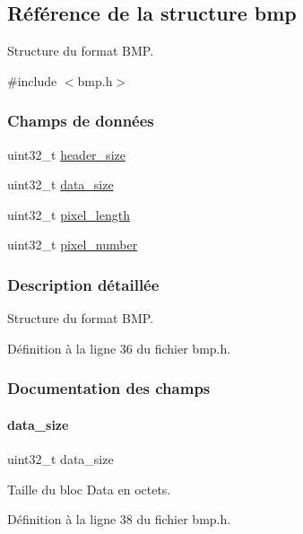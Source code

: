 \hypertarget{a00162}{}\subsection{Référence de la structure bmp}
\label{a00162}


Structure du format B\+MP.  




{\ttfamily \#include $<$bmp.\+h$>$}

\subsubsection*{Champs de données}
\begin{DoxyCompactItemize}
\item 
uint32\+\_\+t \hyperlink{a00162_a841923a20e6dda97c59351c8e97c9be6}{header\+\_\+size}
\item 
uint32\+\_\+t \hyperlink{a00162_ab670c6c21aced4765ecd6b29283f22b0}{data\+\_\+size}
\item 
uint32\+\_\+t \hyperlink{a00162_a764a3dd695d8520703072cec417cb8b0}{pixel\+\_\+length}
\item 
uint32\+\_\+t \hyperlink{a00162_af0fcf1fc8e012d9794e3085c98aea38a}{pixel\+\_\+number}
\end{DoxyCompactItemize}


\subsubsection{Description détaillée}
Structure du format B\+MP. 

Définition à la ligne 36 du fichier bmp.\+h.



\subsubsection{Documentation des champs}
\mbox{\label{a00162_ab670c6c21aced4765ecd6b29283f22b0}} 
\paragraph{\texorpdfstring{data\+\_\+size}{data\_size}}
{\footnotesize\ttfamily uint32\+\_\+t data\+\_\+size}

Taille du bloc Data en octets. 

Définition à la ligne 38 du fichier bmp.\+h.

